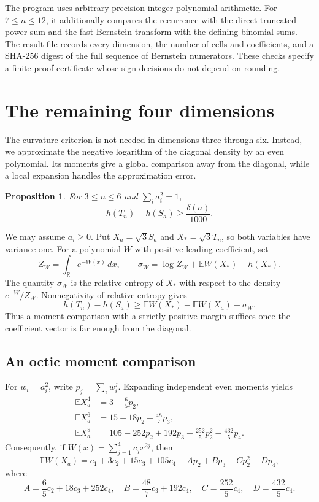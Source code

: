 \documentclass[11pt,a4paper]{article}
\newtheorem{proposition}[theorem]{Proposition}
\theoremstyle{remark}\newtheorem{remark}[theorem]{Remark}
\newcommand{\E}{\mathbb E}
\begin{document}
The program uses arbitrary-precision integer polynomial arithmetic.
For $7\le n\le12$, it additionally compares the recurrence with the
direct truncated-power sum and the fast Bernstein transform with
the defining binomial sums. The result file records every dimension,
the number of cells and coefficients, and a SHA-256 digest of the
full sequence of Bernstein numerators. These checks specify a finite
proof certificate whose sign decisions do not depend on rounding.

\section{The remaining four dimensions}\label{sec:small}
The curvature criterion is not needed in dimensions three through six.
Instead, we approximate the negative logarithm of the diagonal density by
an even polynomial. Its moments give a global comparison away from the
diagonal, while a local expansion handles the approximation error.

\begin{proposition}\label{prop:small}
For $3\le n\le6$ and $\sum_i a_i^2=1$,
\[
 h(T_n)-h(S_a)\ge \frac{\delta(a)}{1000}.
\]
\end{proposition}

We may assume $a_i\ge0$. Put $X_a=\sqrt3S_a$ and $X_*=\sqrt3T_n$,
so both variables have variance one. For a polynomial $W$ with positive
leading coefficient, set
\[
 Z_W=\int_{\mathbb R}e^{-W(x)}\,dx,\qquad
 \sigma_W=\log Z_W+\E W(X_*)-h(X_*).
\]
The quantity $\sigma_W$ is the relative entropy of $X_*$ with respect
to the density $e^{-W}/Z_W$. Nonnegativity of relative entropy gives
\begin{equation}\label{eq:small-gibbs}
 h(T_n)-h(S_a)
 \ge \E W(X_*)-\E W(X_a)-\sigma_W.
\end{equation}
Thus a moment comparison with a strictly positive margin suffices once
the coefficient vector is far enough from the diagonal.

\subsection{An octic moment comparison}
For $w_i=a_i^2$, write $p_j=\sum_iw_i^j$. Expanding independent even
moments yields
\begin{align*}
 \E X_a^4&=3-\frac65p_2,\\
 \E X_a^6&=15-18p_2+\frac{48}{7}p_3,\\
 \E X_a^8&=105-252p_2+192p_3+\frac{252}{5}p_2^2-\frac{432}{5}p_4.
\end{align*}
Consequently, if $W(x)=\sum_{j=1}^4c_jx^{2j}$, then
\[
 \E W(X_a)=c_1+3c_2+15c_3+105c_4-Ap_2+Bp_3+Cp_2^2-Dp_4,
\]
where
\[
 A=\frac65c_2+18c_3+252c_4,\quad
 B=\frac{48}{7}c_3+192c_4,\quad
 C=\frac{252}{5}c_4,\quad D=\frac{432}{5}c_4.
\]
\end{document}
